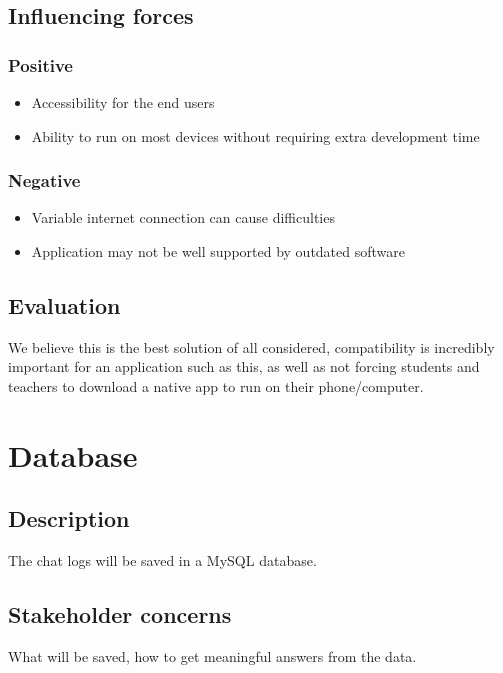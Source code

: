 \documentclass[12pt, a4paper]{article}
\begin{document}
\subsection{Influencing forces}
\begin{minipage}[t]{0.5\textwidth}
    \subsubsection*{Positive}
    \begin{itemize}
        \item Accessibility for the end users
        \item Ability to run on most devices without requiring extra development time
    \end{itemize}
\end{minipage}%
\begin{minipage}[t]{0.5\textwidth}
    \subsubsection*{Negative}
    \begin{itemize}
        \item Variable internet connection can cause difficulties
        \item Application may not be well supported by outdated software
    \end{itemize}
\end{minipage}
\subsection{Evaluation}
We believe this is the best solution of all considered, compatibility is incredibly important for an application such as this, as well as not forcing students and teachers to download a native app to run on their phone/computer.

\newpage
\section{Database} %
\subsection{Description}
The chat logs will be saved in a MySQL database.
\subsection{Stakeholder concerns}
What will be saved, how to get meaningful answers from the data.
\end{document}
